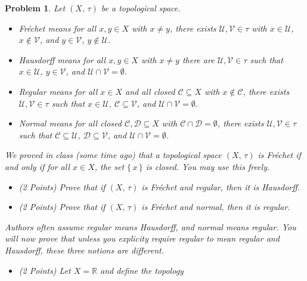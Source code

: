 \documentclass{article}
\theoremstyle{normal}
\newtheorem{problem}{Problem}
\begin{document}
    \begin{problem}
        Let $(X,\,\tau)$ be a topological space.
        \begin{itemize}
            \item Fr\'{e}chet means for all $x,y\in{X}$ with $x\ne{y}$, there
                exists $\mathcal{U},\mathcal{V}\in\tau$ with $x\in\mathcal{U}$,
                $x\notin\mathcal{V}$, and $y\in\mathcal{V}$,
                $y\notin\mathcal{U}$.
            \item Hausdorff means for all $x,y\in{X}$ with $x\ne{y}$ there
                are $\mathcal{U},\mathcal{V}\in\tau$ such that
                $x\in\mathcal{U}$, $y\in\mathcal{V}$, and
                $\mathcal{U}\cap\mathcal{V}=\emptyset$.
            \item Regular means for all $x\in{X}$ and all closed
                $\mathcal{C}\subseteq{X}$ with $x\notin\mathcal{C}$, there
                exists $\mathcal{U},\mathcal{V}\in\tau$ such that
                $x\in\mathcal{U}$, $\mathcal{C}\subseteq\mathcal{V}$, and
                $\mathcal{U}\cap\mathcal{V}=\emptyset$.
            \item Normal means for all closed
                $\mathcal{C},\mathcal{D}\subseteq{X}$ with
                $\mathcal{C}\cap\mathcal{D}=\emptyset$, there exists
                $\mathcal{U},\mathcal{V}\in\tau$ such that
                $\mathcal{C}\subseteq\mathcal{U}$,
                $\mathcal{D}\subseteq\mathcal{V}$, and
                $\mathcal{U}\cap\mathcal{V}=\emptyset$.
        \end{itemize}
        We proved in class (some time ago) that a topological space $(X,\,\tau)$
        is Fr\'{e}chet if and only if for all $x\in{X}$, the set
        $\{\,x\,\}$ is closed. You may use this freely.
        \begin{itemize}
            \item (2 Points) Prove that if $(X,\,\tau)$ is Fr\'{e}chet and
                regular, then it is Hausdorff.
            \item (2 Points) Prove that if $(X,\,\tau)$ is Fr\'{e}chet and
                normal, then it is regular.
        \end{itemize}
        Authors often assume regular means Hausdorff, and normal means regular.
        You will now prove that unless you explicity require regular to mean
        regular and Hausdorff, these three notions are different.
        \begin{itemize}
            \item (2 Points) Let $X=\mathbb{R}$ and define the topology

\end{itemize}
\end{problem}
\end{document}
